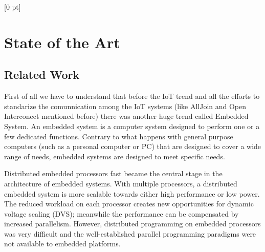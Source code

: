 \titlespacing{\chapter}{0 pt}{30 pt}{50 pt}[0 pt]
\titleformat{\section}{\Large\bfseries}{\thesection}{0 pt}{\hspace{30 pt}}
\titleformat{\subsection}{\large\bfseries}{\thesubsection}{0 pt}{\hspace{30 pt}}
\pagestyle{fancy}
\fancyhead[LO,LE]{\footnotesize\textit{\leftmark}}
\fancyhead[RO,RE]{\thepage}
\fancyfoot[CO,CE]{}

\chapter{State of the Art} %

\normalsize

\section{Related Work}
\noindent

First of all we have to understand that before the IoT trend and all the
efforts to standarize the comunnication among the IoT systems (like AllJoin and
Open Interconect mentioned before) there was another
huge trend called Embedded System. An embedded system is a computer system 
designed to perform one or a few dedicated functions. Contrary to what happens 
with general purpose computers (such as a personal computer or PC) that are 
designed to cover a wide range of needs, embedded systems are designed to meet 
specific needs.

Distributed embedded processors fast became the central stage in the
architecture of embedded systems. With multiple processors, a distributed
embedded system is more scalable towards either high performance or low
power. The reduced workload on each processor creates new opportunities for
dynamic voltage scaling (DVS); meanwhile the performance can be compensated by
increased parallelism. However, distributed programming on embedded processors
was very difficult and the well-established parallel programming paradigms
were not available to embedded platforms. 

